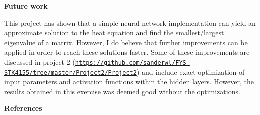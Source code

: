 \documentclass[12pt,a4paper]{article}
\begin{document}
\newpage

\begin{center}
\Large{\textbf{Future work}}
\end{center}

\noindent This project has shown that a simple neural network implementation can yield an approximate solution to the heat equation and find the smallest/largest eigenvalue of a matrix. However, I do believe that further improvements can be applied in order to reach these solutions faster. Some of these improvements are discussed in project 2 (\href{{https://github.com/sanderwl/FYS-STK4155/tree/master/Project2/Project2}}{\nolinkurl{https://github.com/sanderwl/FYS-STK4155/tree/master/Project2/Project2}}) and include exact optimization of input parameters and activation functions within the hidden layers. However, the results obtained in this exercise was deemed good without the optimizations.

\newpage

\begin{center}
\Large{\textbf{References}}
\end{center}
\end{document}

